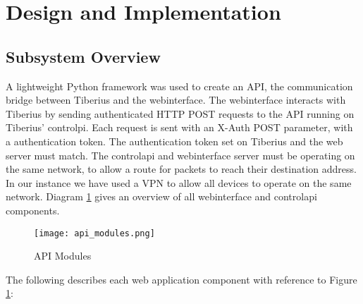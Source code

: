 \section{Design and Implementation}

\subsection{Subsystem Overview}
\label{sec:web_subsystem_overview}
A lightweight Python framework was used to create an API, the communication bridge between Tiberius and the \gls{webinterface}. The \gls{webinterface} interacts with Tiberius by sending authenticated \gls{HTTP} \gls{POST} requests to the \gls{API} running on Tiberius' \gls{controlpi}.
\newline
Each request is sent with an X-Auth \gls{POST} parameter, with a authentication token. The authentication token set on Tiberius and the web server must match.
\newline
The \gls{controlapi} and \gls{webinterface} server must be operating on the same network, to allow a route for packets to reach their destination address. In our instance we have used a \gls{VPN} to allow all devices to operate on the same network.
\newline
Diagram \ref{fig:api-modules} gives an overview of all \gls{webinterface} and \gls{controlapi} components.
\newline

\begin{figure}[!htb]
\begin{center}
\texttt{[image: api\_modules.png]}
\end{center}
\caption{API Modules}
\label{fig:api-modules}
\end{figure}
\noindent
The following describes each web application component with reference to Figure \ref{fig:api-modules}:

